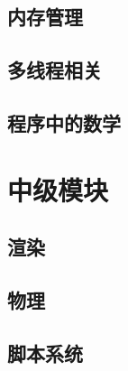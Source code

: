 \documentclass[
    UTF8,       %
    b5paper,    %
    10pt,       %
    oneside,    %
    openright,  %
    titlepage,  %
    final       %
]{ctexbook}
\begin{document}
    \chapter{内存管理}
    

    \maketitle
    \chapter{多线程相关}

    \maketitle
    \chapter{程序中的数学}
    

    \maketitle
    \part{中级模块}

    \maketitle
    \chapter{渲染}

    \maketitle
    \chapter{物理}

    \maketitle
    \chapter{脚本系统}
\end{document}
